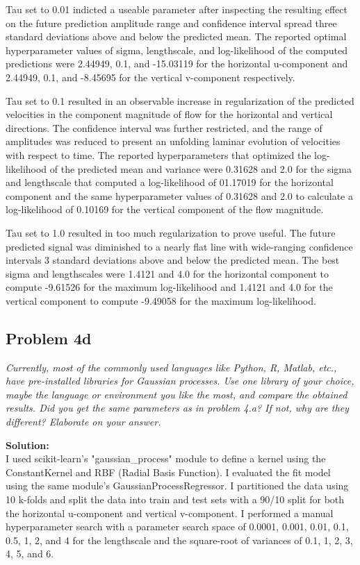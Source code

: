 \documentclass[11pt]{article}
\newcommand{\question}[1]{\textit{#1}}
\begin{document}
Tau set to 0.01 indicted a useable parameter after inspecting the resulting effect on the future prediction amplitude range and confidence interval spread three standard deviations above and below the predicted mean. The reported optimal hyperparameter values of sigma, lengthscale, and log-likelihood of the computed predictions were 2.44949, 0.1, and -15.03119 for the horizontal u-component and 2.44949, 0.1, and -8.45695 for the vertical v-component respectively. 

Tau set to 0.1 resulted in an observable increase in regularization of the predicted velocities in the component magnitude of flow for the horizontal and vertical directions. The confidence interval was further restricted, and the range of amplitudes was reduced to present an unfolding laminar evolution of velocities with respect to time. The reported hyperparameters that optimized the log-likelihood of the predicted mean and variance were 0.31628 and 2.0 for the sigma and lengthscale that computed a log-likelihood of 01.17019 for the horizontal component and the same hyperparameter values of 0.31628 and 2.0 to calculate a log-likelihood of 0.10169 for the vertical component of the flow magnitude. 

Tau set to 1.0 resulted in too much regularization to prove useful. The future predicted signal was diminished to a nearly flat line with wide-ranging confidence intervals 3 standard deviations above and below the predicted mean. The best sigma and lengthscales were 1.4121 and 4.0 for the horizontal component to compute -9.61526 for the maximum log-likelihood and 1.4121 and 4.0 for the vertical component to compute -9.49058 for the maximum log-likelihood.

\subsection{Problem 4d}

\question{Currently, most of the commonly used languages like Python, R, Matlab, etc., have pre-installed libraries for Gaussian processes. Use one library of your choice, maybe the language or environment you like the most, and compare the obtained results. Did you get the same parameters as in problem 4.a? If not, why are they different? Elaborate on your answer. }

\textbf{Solution:} \\

I used scikit-learn's "gaussian\_process" module to define a kernel using the ConstantKernel and RBF (Radial Basis Function). I evaluated the fit model using the same module's GaussianProcessRegressor. I partitioned the data using 10 k-folds and split the data into train and test sets with a 90/10 split for both the horizontal u-component and vertical v-component. I performed a manual hyperparameter search with a parameter search space of 0.0001, 0.001, 0.01, 0.1, 0.5, 1, 2, and 4 for the lengthscale and the square-root of variances of 0.1, 1, 2, 3, 4, 5, and 6. 
\end{document}

